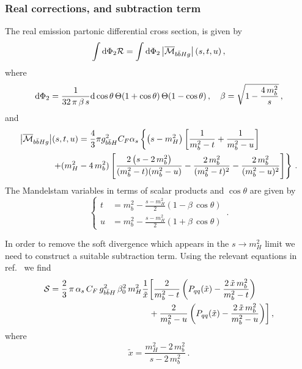 \subsubsection{Real corrections, and subtraction term}
The real emission partonic differential cross section, is given by
\begin{equation}
 \int {\rm d} \Phi_{2}  {\cal R} =\int {\rm d} \Phi_{2}  \left| \overline{{\cal M}}_{b\bar{b}Hg} \right|(s,t,u)\,,
\end{equation}
where 
\begin{equation}
  {\rm d} \Phi_{2}=\frac{1}{32\,\pi\,\beta\,s} {\rm d}\cos\theta\,
  \Theta(1+\cos\theta )\,\Theta(1-\cos\theta)\, , \quad
  \beta=\sqrt{1-\frac{4\,m_b^2}{s}}\,,
\end{equation}
and
\begin{equation}
  \label{eq:real}
  \begin{split}
    \left| \overline{{\cal M}}_{b\bar{b}Hg} \right|&(s,t,u) = 
    \frac{4}{3}\pi g_{b\bar{b}H}^2C_F\alpha_s
    \left\{
      \left( s-m_H^2\right)\left[ \frac{1}{m_b^2-t}
        + \frac{1}{m_b^2-u}\right]
    \right.\\
    &
    \left.+ (m_H^2-4\,m_b^2)
      \left[
        \frac{2\left( s-2\,m_b^2 \right)}{(m_b^2-t)(m_b^2-u)} -
        \frac{2\,m_b^2}{(m_b^2-t)^2} -
        \frac{2\,m_b^2}{(m_b^2-u)^2}
      \right]
    \right\}\,.
  \end{split}
\end{equation}
The Mandelstam variables in terms of scalar
products and $\cos\theta$ are given by
\begin{equation}
  \left\{
    \begin{split}
      t &= m_b^2 - \frac{s-m_H^2}{2}\left( 1-\beta\,\cos\theta\right)\\
      u &= m_b^2 - \frac{s-m_H^2}{2}\left( 1+\beta\,\cos\theta\right) 
    \end{split}
  \right.\,.
\end{equation}

In order to remove the soft divergence which appears in the  $s\rightarrow
m_H^2$ limit we need to construct a suitable  subtraction term. Using
the relevant 
equations in ref.~\cite{Krauss:2017wmx} we find
\begin{align}
  \label{eq:sub}
  {\cal S} =
  \frac{2}{3}\,\pi \,\alpha_s\,C_F\,g_{b\bar{b}H}^2\,\beta_0^2\,m_H^2
  \frac{1}{\tilde{x}}&
  \biggl[\frac{2}{m_b^2-t}\left( P_{qq}(\tilde{x})-\frac{2\,\tilde{x}\,m_b^2}{m_b^2-t} \right) \nonumber \\
    &+\frac{2}{m_b^2-u}\left( P_{qq}(\tilde{x})-\frac{2\,\tilde{x}\,m_b^2}{m_b^2-u} \right)\biggr]\,,
\end{align}
where
\begin{equation}
  \tilde{x} = \frac{m_H^2-2\,m_b^2}{s-2\,m_b^2}\,.
\end{equation}

